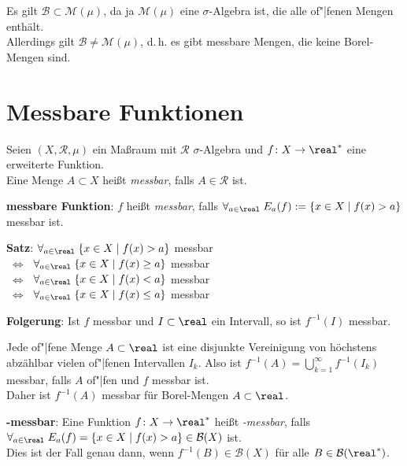 Es gilt $\mathcal{B} \subset \mathcal{M}(\mu)$, da ja $\mathcal{M}(\mu)$ eine
$\sigma$-Algebra ist, die alle of"|fenen Mengen enthält. \\
Allerdings gilt $\mathcal{B} \not= \mathcal{M}(\mu)$, d.\,h. es gibt
messbare Mengen, die keine Borel-Mengen sind.

\pagebreak

\section{%
    Messbare Funktionen%
}

Seien $(X, \mathcal{R}, \mu)$ ein Maßraum mit $\mathcal{R}$ $\sigma$-Algebra
und $f\colon X \rightarrow \real^\ast$ eine erweiterte Funktion. \\
Eine Menge $A \subset X$ heißt \emph{messbar}, falls $A \in \mathcal{R}$ ist.

\textbf{messbare Funktion}:
$f$ heißt \emph{messbar}, falls
$\forall_{a \in \real}\; E_a(f) := \{x \in X \;|\; f(x) > a\}$ messbar ist.

\textbf{Satz}:
$\forall_{a \in \real}\; \{x \in X \;|\; f(x) > a\}$ messbar \\
$\;\Leftrightarrow\;$
$\forall_{a \in \real}\; \{x \in X \;|\; f(x) \ge a\}$ messbar \\
$\;\Leftrightarrow\;$
$\forall_{a \in \real}\; \{x \in X \;|\; f(x) < a\}$ messbar \\
$\;\Leftrightarrow\;$
$\forall_{a \in \real}\; \{x \in X \;|\; f(x) \le a\}$ messbar

\textbf{Folgerung}:
Ist $f$ messbar und $I \subset \real$ ein Intervall,
so ist $f^{-1}(I)$ messbar.

Jede of"|fene Menge $A \subset \real$ ist eine disjunkte Vereinigung von
höchstens abzählbar vielen of"|fenen Intervallen $I_k$.
Also ist $f^{-1}(A) = \bigcup_{k=1}^\infty f^{-1}(I_k)$
messbar, falls $A$ of"|fen und $f$ messbar ist. \\
Daher ist $f^{-1}(A)$ messbar für Borel-Mengen $A \subset \real$.

\textbf{-messbar}:
Eine Funktion $f\colon X \rightarrow \real^\ast$ heißt
\emph{-messbar}, falls \\
$\forall_{a \in \real}\; E_a(f) = \{x \in X \;|\; f(x) > a\}
\in \mathcal{B}(X)$ ist. \\
Dies ist der Fall genau dann, wenn $f^{-1}(B) \in \mathcal{B}(X)$ für alle
$B \in \mathcal{B}(\real^\ast)$.

\linie

